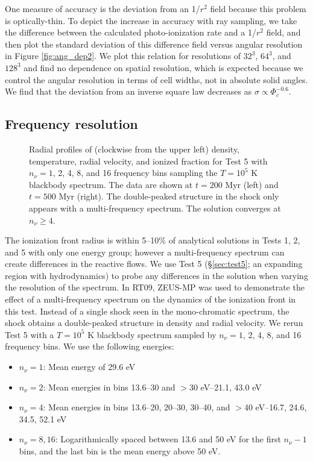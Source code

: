 \documentclass[useAMS,usenatbib]{mn2e}
\begin{document}
One measure of accuracy is the deviation from an 1/$r^2$ field because
this problem is optically-thin.  To depict the increase in accuracy
with ray sampling, we take the difference between the calculated
photo-ionization rate and a 1/$r^2$ field, and then plot the standard
deviation of this difference field versus angular resolution in Figure
\ref{fig:ang_dep2}.  We plot this relation for resolutions of $32^3$,
$64^3$, and $128^3$ and find no dependence on spatial resolution,
which is expected because we control the angular resolution in terms
of cell widths, not in absolute solid angles.  We find that the
deviation from an inverse square law decreases as $\sigma \propto
\Phi_c^{-0.6}$.

\subsection{Frequency resolution}
\label{sec:nu_dep}

\begin{figure*}
  \caption{\label{fig:nu_dep} Radial profiles of (clockwise from the
    upper left) density, temperature, radial velocity, and ionized
    fraction for Test 5 with $n_\nu = 1$, 2, 4, 8, and 16 frequency
    bins sampling the $T=10^5$ K blackbody spectrum.  The data are
    shown at $t = 200$ Myr (left) and $t = 500$ Myr (right).  The
    double-peaked structure in the shock only appears with a
    multi-frequency spectrum.  The solution converges at $n_\nu \ge
    4$.}  
\end{figure*}

The ionization front radius is within 5--10\% of analytical solutions
in Tests 1, 2, and 5 with only one energy group; however a
multi-frequency spectrum can create differences in the reactive flows.
We use Test 5 (\S\ref{sec:test5}; an expanding \hii region with
hydrodynamics) to probe any differences in the solution when varying
the resolution of the spectrum.  In RT09, ZEUS-MP was used to
demonstrate the effect of a multi-frequency spectrum on the dynamics
of the ionization front in this test.  Instead of a single shock seen
in the mono-chromatic spectrum, the shock obtains a double-peaked
structure in density and radial velocity.  We rerun Test 5 with a
$T=10^5$ K blackbody spectrum sampled by $n_\nu = 1$, 2, 4, 8, and 16
frequency bins.  We use the following energies:
%
\begin{itemize}
\item $n_\nu = 1$: Mean energy of 29.6 eV
\item $n_\nu = 2$: Mean energies in bins 13.6--30 and $>$30 eV--21.1,
  43.0 eV
\item $n_\nu = 4$: Mean energies in bins 13.6--20, 20--30, 30--40, and
  $>$40 eV--16.7, 24.6, 34.5, 52.1 eV
\item $n_\nu = 8, 16$: Logarithmically spaced between 13.6 and 50 eV
  for the first $n_\nu-1$ bins, and the last bin is the mean energy
  above 50 eV.
\end{itemize}
\end{document}
